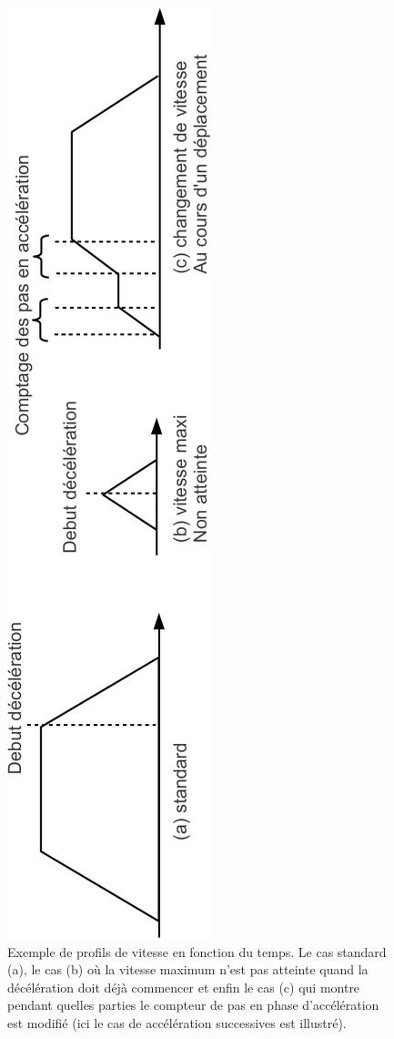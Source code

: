 \documentclass[11pt,a4paper,oneside,onecolumn]{article}
\begin{document}
\begin{figure}[th]
\begin{center}
\includegraphics[angle=-90,width=\textwidth]{./figs/MPPSYNC_speedProfiles}
\caption{Exemple de profils de vitesse en fonction du temps. Le cas standard (a), le cas (b) où la vitesse maximum n'est pas atteinte quand la décélération doit déjà commencer et enfin le cas (c) qui montre pendant quelles parties le compteur de pas en phase d'accélération est modifié (ici le cas de accélération successives est illustré).}
\label{MPPSYNC_speedProfiles}
\end{center}
\end{figure}
\end{document}
